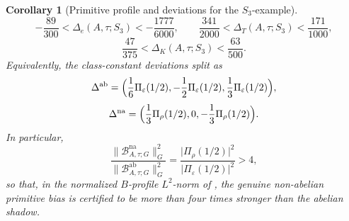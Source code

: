 \documentclass[11pt,a4paper]{amsart}
\theoremstyle{plain}
\newtheorem{corollary}[theorem]{Corollary}
\theoremstyle{definition}
\theoremstyle{remark}
\newcommand{\abs}[1]{\lvert #1 \rvert}
\newcommand{\norm}[1]{\lVert #1 \rVert}
\begin{document}
\begin{corollary}[Primitive profile and deviations for the
  \(S_3\)-example]
  \begin{equation}\label{eq:s3-example-delta-certified-windows}
    -\frac{89}{300}
    <\Delta_e(A,\tau;S_3)<-\frac{1777}{6000},
    \qquad
    \frac{341}{2000}
    <\Delta_T(A,\tau;S_3)<\frac{171}{1000},
  \end{equation}
  \begin{equation}\label{eq:s3-example-delta-k-certified-window}
    \frac{47}{375}
    <\Delta_K(A,\tau;S_3)<\frac{63}{500}.
  \end{equation}
  Equivalently, the class-constant deviations split as
  \begin{equation}\label{eq:s3-example-abelian-shadow}
    \Delta^{\mathrm{ab}}
    =
    \Bigl(
      \frac16\Pi_\varepsilon(1/2),
      -\frac12\Pi_\varepsilon(1/2),
      \frac13\Pi_\varepsilon(1/2)
    \Bigr),
  \end{equation}
  \begin{equation}\label{eq:s3-example-nonabelian-defect}
    \Delta^{\mathrm{na}}
    =
    \Bigl(
      \frac13\Pi_\rho(1/2),
      0,
      -\frac13\Pi_\rho(1/2)
    \Bigr).
  \end{equation}
  In particular,
  \begin{equation}\label{eq:s3-example-energy-ratio}
    \frac{\norm{\mathcal B_{A,\tau;G}^{\mathrm{na}}}_G^2}
         {\norm{\mathcal B_{A,\tau;G}^{\mathrm{ab}}}_G^2}
    =
    \frac{\abs{\Pi_\rho(1/2)}^2}
         {\abs{\Pi_\varepsilon(1/2)}^2}
    >4,
  \end{equation}
  so that, in the normalized \(B\)-profile \(L^2\)-norm of
  , the genuine non-abelian primitive
  bias is certified to be more than four times stronger than the
  abelian shadow.
\end{corollary}
\end{document}
